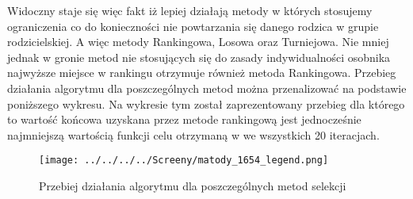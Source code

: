 \begin{itemize}
\begin{table}[h!]
\begin{center}
\caption{Ranking metod selekcji na podstawie średniej wartości funkcji celu}
\label{ranking_1}
\end{center}
\end{table}

Widoczny staje się więc fakt iż lepiej działają metody w których stosujemy ograniczenia co do konieczności nie powtarzania się danego rodzica w grupie rodzicielskiej. A więc metody Rankingowa, Losowa oraz Turniejowa. Nie mniej jednak w gronie metod nie stosujących się do zasady indywidualności osobnika najwyższe miejsce w rankingu otrzymuje również metoda Rankingowa. Przebieg działania algorytmu dla poszczególnych metod można przenalizować na podstawie poniższego wykresu. Na wykresie tym został zaprezentowany przebieg dla którego to wartość końcowa uzyskana przez metode rankingową jest jednocześnie najmniejszą wartością funkcji celu otrzymaną w we wszystkich 20 iteracjach.\\
\begin{figure}[ht]
		\texttt{[image: ../../../../Screeny/matody\_1654\_legend.png]}
		\caption{Przebiej działania algorytmu dla poszczególnych metod selekcji}
		\label{ranking}			
\end{figure}


\end{itemize}

